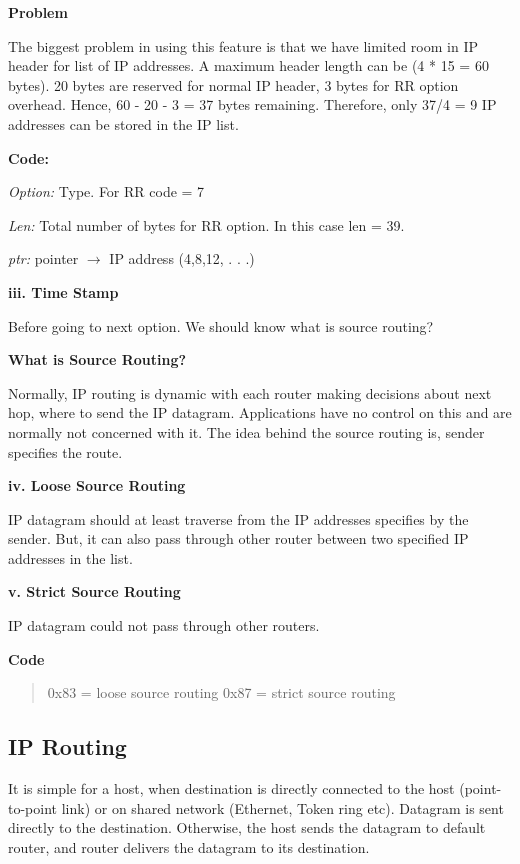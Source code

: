 \documentclass[letterpaper,10pt,english]{sphinxmanual}
\begin{document}
\textbf{Problem}

The biggest problem in using this feature is that we have limited room in IP header for list of IP addresses. A maximum header length can be (4 * 15 = 60 bytes). 20 bytes are reserved for normal IP header, 3 bytes for RR option overhead. Hence, 60 - 20 - 3 = 37 bytes remaining. Therefore, only 37/4 = 9 IP addresses can be stored in the IP list.

\textbf{Code:}

\emph{Option:}       Type. For RR code = 7

\emph{Len:}          Total number of bytes for RR option. In this case len = 39.

\emph{ptr:}          pointer \(\rightarrow\) IP address (4,8,12, . . .)

\textbf{iii. Time Stamp}

Before going to next option. We should know what is source routing?

\textbf{What is Source Routing?}

Normally, IP routing is dynamic with each router making decisions about next hop, where to send the IP datagram. Applications have no control on this and are normally not concerned with it. The idea behind the source routing is, sender specifies the route.

\textbf{iv. Loose Source Routing}

IP datagram should at least traverse from the IP addresses specifies by the sender. But, it can also pass through other router between two specified IP addresses in the list.

\textbf{v. Strict Source Routing}

IP datagram could not pass through other routers.

\textbf{Code}
\begin{quote}

0x83 = loose source routing
0x87 = strict source routing
\end{quote}


\subsection{IP Routing}
\label{week-06:ip-routing}
It is simple for a host, when destination is directly connected to the host (point-to-point link) or on shared network (Ethernet, Token ring etc). Datagram is sent directly to the destination. Otherwise, the host sends the datagram to default router, and router delivers the datagram to its destination.
\end{document}
